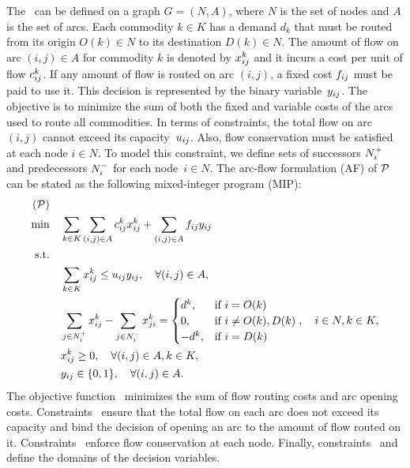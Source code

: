 \documentclass[3p, authoryear, times, doubleblind]{elsarticle}
\begin{document}
{The \fcn\ can be defined on a graph \( G = (N, A) \), where \( N \) is the set 
of nodes and \( A \) is the set of arcs. Each commodity $k \in K$ has a demand $d_k$ that must be routed from its origin $O(k) \in N$ to its destination $D(k) \in N$. The amount of flow on arc $(i,j) \in A$ for commodity $k$ is denoted by $x_{ij}^k$ and it incurs a cost per unit of flow $c_{ij}^k$. If any amount of flow is routed on arc $(i,j)$, a fixed cost $f_{ij}$ must be paid to use it. This decision is represented by the binary variable~$y_{ij}$.  The objective  is to minimize the sum of both the fixed and variable costs of the arcs used to route all commodities. In terms of constraints, the total flow on arc~$(i,j)$ cannot exceed its capacity~$u_{ij}$. Also, flow conservation must be satisfied at each node $i \in N$. To model this constraint, we define sets of successors $N_i^{+}$ and predecessors $N_i^{-}$ for each node~$i \in N$. The arc-flow formulation (AF) of $\mathcal{P}$ can be stated as the following mixed-integer program (MIP): 
\begin{align}
(\mathcal{P}) \quad & \nonumber \\
\min \quad & \sum_{k \in K} \sum_{(i,j) \in A} c_{ij}^k x_{ij}^k + \sum_{(i,j) \in A} f_{ij} y_{ij} \label{eq:obj} \\
\text{s.t.} \quad & \nonumber \\ 
& \sum_{k \in K} x_{ij}^k \leq u_{ij} y_{ij},  \quad \forall (i,j) \in A, \label{eq:capacity} \\
& \sum_{j \in N_i^{+}} x_{ij}^k - \sum_{j \in N_i^{-}} x_{ji}^k = \begin{cases}
    d^k, & \text{if } i = O(k) \\
    0, & \text{if } i \neq O(k), D(k) \\
    -d^k, & \text{if } i = D(k)
    \end{cases}, \quad i \in N, k \in K, \label{eq:flow_conservation} \\
& x_{ij}^k \geq 0, \quad \forall (i,j) \in A, k \in K, \label{eq:nonnegativity} \\
& y_{ij} \in \{0,1\},\quad \forall (i,j) \in A. \label{eq:binary}
\end{align}
The objective function~ minimizes the sum of flow routing costs and arc opening costs. Constraints~ ensure that the total flow on each arc does not exceed its capacity and  bind the decision of opening an arc to the amount of flow routed on it. Constraints~ enforce flow conservation at each node. Finally, constraints~ and  define the domains of the decision variables.


}
\end{document}
